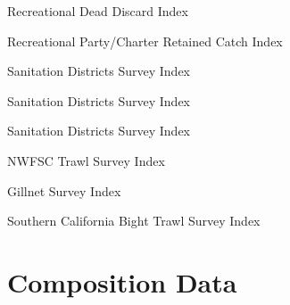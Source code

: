 \documentclass[ignorenonframetext,]{beamer}
\begin{document}
\begin{frame}{Recreational Dead Discard Index}

\end{frame}

\begin{frame}{Recreational Party/Charter Retained Catch Index}

\end{frame}

\begin{frame}{Sanitation Districts Survey Index}

\begin{table}[ht]
\centering
{}
\end{table}

\end{frame}

\begin{frame}{Sanitation Districts Survey Index}

\end{frame}

\begin{frame}{Sanitation Districts Survey Index}

\end{frame}

\begin{frame}{NWFSC Trawl Survey Index}

\end{frame}

\begin{frame}{Gillnet Survey Index}

\end{frame}

\begin{frame}{Southern California Bight Trawl Survey Index}

\end{frame}

\section{Composition Data}\label{composition-data}
\end{document}
